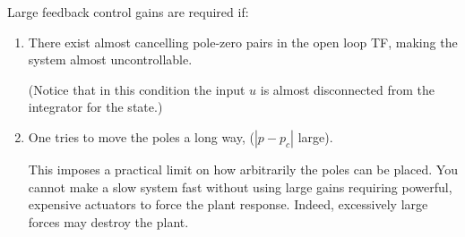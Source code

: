 Large feedback control gains are required if:
\begin{enumerate}
	\item There exist almost cancelling pole-zero pairs in the open loop TF, making the system almost uncontrollable.
\begin{center}
\end{center}
	(Notice that in this condition the input $u$ is almost disconnected from the integrator for the state.)
	\item One tries to move the poles a long way, ($|p-p_c|$ large). 
	
	This imposes a practical limit on how arbitrarily 
	the poles can be placed. You cannot make a slow system fast without using large gains requiring powerful, 
	expensive actuators to force the plant response. Indeed, excessively large forces may destroy the plant.
\end{enumerate}

\endinput

